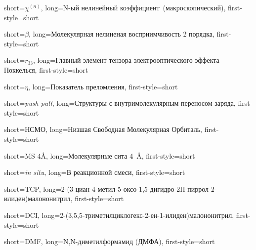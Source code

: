 {
    short={$\chi^{(n)}$},
    long={N-ый нелинейный коэффициент~(макроскопический)},
    first-style=short
}

{
    short={$\beta$},
    long={Молекулярная нелиненая восприимчивость 2 порядка},
    first-style=short
}

{
    short={$r_{33}$},
    long={Главный элемент тензора электрооптического эффекта Поккелься},
    first-style=short
}

{
    short={$\eta$},
    long={Показатель преломления},
    first-style=short
}

{
    short={\emph{push-pull}},
    long={Структуры с внутримолекулярным переносом заряда},
    first-style=short
}

{
    short={НСМО},
    long={Низшая Свободная Молекулярная Орбиталь},
    first-style=short
}

{
    short={MS 4Å},
    long={Молекулярные сита \SI{4}{\angstrom}},
    first-style=short
}

{
    short={\emph{in situ}},
    long={В реакционной смеси},
    first-style=short
}

{
    short={TCP},
    long={2-(3-циан-4-метил-5-оксо-1,5-дигидро-2H-пиррол-2-илиден)малононитрил},
    first-style=short
}

{
    short={DCI},
    long={2-(3,5,5-триметилциклогекс-2-ен-1-илиден)малононитрил},
    first-style=short
}

{
    short={DMF},
    long={N,N-диметилформамид (ДМФА)},
    first-style=short
}